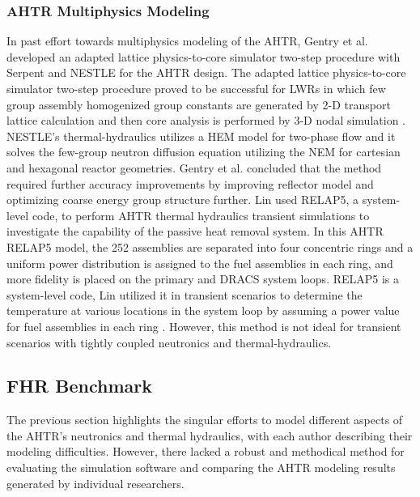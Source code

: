 \subsubsection{AHTR Multiphysics Modeling}
In past effort towards multiphysics modeling of the \gls{AHTR}, Gentry et al. 
\cite{gentry_development_2016} developed an adapted lattice physics-to-core 
simulator two-step procedure with Serpent \cite{leppanen_serpent_2014} 
and \gls{NESTLE} \cite{turinsky_nestle_1994} for the \gls{AHTR} design. 
The adapted lattice physics-to-core simulator two-step procedure proved to be 
successful for \glspl{LWR} in which few group assembly homogenized group 
constants are generated by 2-D transport lattice calculation and then core 
analysis is performed by 3-D nodal simulation 
\cite{koebke_new_1980,gentry_development_2016}.
\gls{NESTLE}'s thermal-hydraulics utilizes a \gls{HEM} model for two-phase 
flow and it solves the few-group neutron diffusion equation utilizing the
\gls{NEM} for cartesian and hexagonal reactor geometries.  
Gentry et al. concluded that the method required further accuracy improvements 
by improving reflector model and optimizing coarse energy group structure further.
Lin \cite{lin_thermal_2020} used RELAP5, a system-level code, to perform 
\gls{AHTR} thermal hydraulics transient simulations to investigate the 
capability of the passive heat removal system. 
In this \gls{AHTR} RELAP5 model, the 252 assemblies are separated into four 
concentric rings and a uniform power distribution is assigned to the fuel 
assemblies in each ring, and more fidelity is placed on the primary and 
\gls{DRACS} system loops. 
RELAP5 is a system-level code, Lin utilized it in transient scenarios to determine 
the temperature at various locations in the system loop by assuming a power 
value for fuel assemblies in each ring \cite{lin_thermal_2020}. 
However, this method is not ideal for transient scenarios with tightly coupled 
neutronics and thermal-hydraulics. 

\subsection{FHR Benchmark}
The previous section highlights the singular efforts to model 
different aspects of the \gls{AHTR}'s neutronics and thermal hydraulics, with
each author describing their modeling difficulties. 
However, there lacked a robust and methodical method for evaluating the 
simulation software and comparing the \gls{AHTR} modeling results generated by 
individual researchers.

